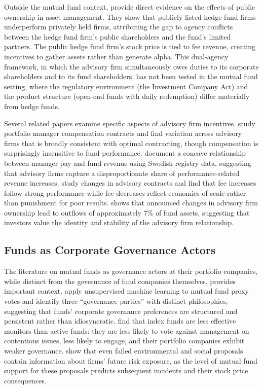 \documentclass[hidelinks,12pt]{article}
\begin{document}
Outside the mutual fund context, \citet{sun2019public} provide direct evidence on the effects of public ownership in asset management. They show that publicly listed hedge fund firms underperform privately held firms, attributing the gap to agency conflicts between the hedge fund firm's public shareholders and the fund's limited partners. The public hedge fund firm's stock price is tied to fee revenue, creating incentives to gather assets rather than generate alpha. This dual-agency framework, in which the advisory firm simultaneously owes duties to its corporate shareholders and to its fund shareholders, has not been tested in the mutual fund setting, where the regulatory environment (the Investment Company Act) and the product structure (open-end funds with daily redemption) differ materially from hedge funds.

Several related papers examine specific aspects of advisory firm incentives. \citet{ma2019compensation} study portfolio manager compensation contracts and find variation across advisory firms that is broadly consistent with optimal contracting, though compensation is surprisingly insensitive to fund performance. \citet{ibert2018fund} document a concave relationship between manager pay and fund revenue using Swedish registry data, suggesting that advisory firms capture a disproportionate share of performance-related revenue increases. \citet{warner2011advisory} study changes in advisory contracts and find that fee increases follow strong performance while fee decreases reflect economies of scale rather than punishment for poor results. \citet{kostovetsky2016whom} shows that announced changes in advisory firm ownership lead to outflows of approximately 7\% of fund assets, suggesting that investors value the identity and stability of the advisory firm relationship.

\subsection{Funds as Corporate Governance Actors}

The literature on mutual funds as governance actors at their portfolio companies, while distinct from the governance of fund companies themselves, provides important context. \citet{bubb2021party} apply unsupervised machine learning to mutual fund proxy votes and identify three ``governance parties'' with distinct philosophies, suggesting that funds' corporate governance preferences are structured and persistent rather than idiosyncratic. \citet{heath2022index} find that index funds are less effective monitors than active funds: they are less likely to vote against management on contentious issues, less likely to engage, and their portfolio companies exhibit weaker governance. \citet{he2023es} show that even failed environmental and social proposals contain information about firms' future risk exposure, as the level of mutual fund support for these proposals predicts subsequent incidents and their stock price consequences.
\end{document}
